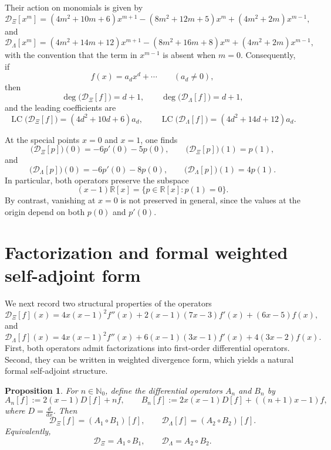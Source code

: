 \documentclass[11pt,twoside]{article}
\newtheorem{proposition}[theorem]{Proposition}
\numberwithin{equation}{section}
\begin{document}
Their action on monomials is given by
\[
\mathcal D_{\Xi}[x^m]
=
(4m^2+10m+6)x^{m+1}
-(8m^2+12m+5)x^m
+(4m^2+2m)x^{m-1},
\]
and
\[
\mathcal D_{\Lambda}[x^m]
=
(4m^2+14m+12)x^{m+1}
-(8m^2+16m+8)x^m
+(4m^2+2m)x^{m-1},
\]
with the convention that the term in \(x^{m-1}\) is absent when \(m=0\). Consequently, if
\[
f(x)=a_d x^d+\cdots \qquad (a_d\neq0),
\]
then
\[
\deg\bigl(\mathcal D_{\Xi}[f]\bigr)=d+1,
\qquad
\deg\bigl(\mathcal D_{\Lambda}[f]\bigr)=d+1,
\]
and the leading coefficients are
\[
\operatorname{LC}\bigl(\mathcal D_{\Xi}[f]\bigr)
=
(4d^2+10d+6)a_d,
\qquad
\operatorname{LC}\bigl(\mathcal D_{\Lambda}[f]\bigr)
=
(4d^2+14d+12)a_d.
\]

At the special points \(x=0\) and \(x=1\), one finds
\[
\bigl(\mathcal D_{\Xi}[p]\bigr)(0)=-6p'(0)-5p(0),
\qquad
\bigl(\mathcal D_{\Xi}[p]\bigr)(1)=p(1),
\]
and
\[
\bigl(\mathcal D_{\Lambda}[p]\bigr)(0)=-6p'(0)-8p(0),
\qquad
\bigl(\mathcal D_{\Lambda}[p]\bigr)(1)=4p(1).
\]
In particular, both operators preserve the subspace
\[
(x-1)\mathbb R[x]=\{p\in\mathbb R[x]:p(1)=0\}.
\]
By contrast, vanishing at \(x=0\) is not preserved in general, since the values at the origin depend on both \(p(0)\) and \(p'(0)\).

\section{Factorization and formal weighted self-adjoint form}

We next record two structural properties of the operators
\[
\mathcal D_{\Xi}[f](x)
=
4x(x-1)^2 f''(x)
+2(x-1)(7x-3)f'(x)
+(6x-5)f(x),
\]
and
\[
\mathcal D_{\Lambda}[f](x)
=
4x(x-1)^2 f''(x)
+6(x-1)(3x-1)f'(x)
+4(3x-2)f(x).
\]
First, both operators admit factorizations into first-order differential operators. Second, they can be written in weighted divergence form, which yields a natural formal self-adjoint structure.

\vspace{0.2cm}

\begin{proposition}\label{prop:factorization}
For \(n\in\mathbb{N}_0\), define the differential operators \(A_n\) and \(B_n\) by
\[
A_n[f]:=2(x-1)D[f]+nf,
\qquad
B_n[f]:=2x(x-1)D[f]+((n+1)x-1)f,
\]
where \(D=\frac{d}{dx}\). Then
\[
\mathcal D_{\Xi}[f]=(A_1\circ B_1)[f],
\qquad
\mathcal D_{\Lambda}[f]=(A_2\circ B_2)[f].
\]
Equivalently,
\[
\mathcal D_{\Xi}=A_1\circ B_1,
\qquad
\mathcal D_{\Lambda}=A_2\circ B_2.
\]
\end{proposition}
\end{document}
